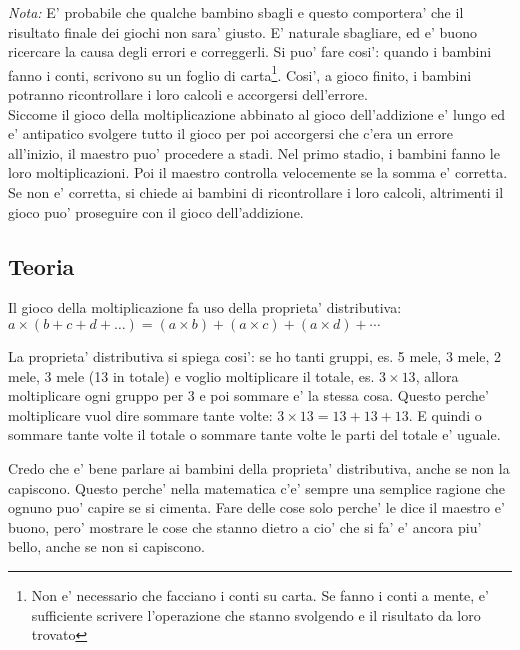 \documentclass[a4paper]{article}
\begin{document}
\emph{Nota:} E' probabile che qualche bambino sbagli e questo comportera' che il risultato finale dei giochi non sara' giusto. E' naturale sbagliare, ed e' buono ricercare la causa degli errori e correggerli. Si puo' fare cosi': quando i bambini fanno i conti, scrivono su un foglio di carta\footnote{Non e' necessario che facciano i conti su carta. Se fanno i conti a mente, e' sufficiente scrivere l'operazione che stanno svolgendo e il risultato da loro trovato}. Cosi', a gioco finito, i bambini potranno ricontrollare i loro calcoli e accorgersi dell'errore.\\
Siccome il gioco della moltiplicazione abbinato al gioco dell'addizione e' lungo ed e' antipatico svolgere tutto il gioco per poi accorgersi che c'era un errore all'inizio, il maestro puo' procedere a stadi. Nel primo stadio, i bambini fanno le loro moltiplicazioni. Poi il maestro controlla velocemente se la somma e' corretta. Se non e' corretta, si chiede ai bambini di ricontrollare i loro calcoli, altrimenti il gioco puo' proseguire con il gioco dell'addizione.


\subsection{Teoria}
Il gioco della moltiplicazione fa uso della proprieta' distributiva: $a \times (b+c+d+\ldots) = (a\times b)+(a\times c)+(a\times d)+\cdots$

\begin{exemp}
\end{exemp}

La proprieta' distributiva si spiega cosi': se ho tanti gruppi, es. 5 mele,  3 mele, 2 mele, 3 mele (13 in totale) e voglio moltiplicare il totale, es. $3 \times 13$, allora moltiplicare ogni gruppo per 3 e poi sommare e' la stessa cosa. Questo perche' moltiplicare vuol dire sommare tante volte: $3\times 13 = 13+13+13$. E quindi o sommare tante volte il totale o sommare tante volte le parti del totale e' uguale.

\begin{rem}
	Credo che e' bene parlare ai bambini della proprieta' distributiva, anche se non la capiscono. Questo perche' nella matematica c'e' sempre una semplice ragione che ognuno puo' capire se si cimenta. Fare delle cose solo perche' le dice il maestro e' buono, pero' mostrare le cose che stanno dietro a cio' che si fa' e' ancora piu' bello, anche se non si capiscono. 
\end{rem}
\end{document}
